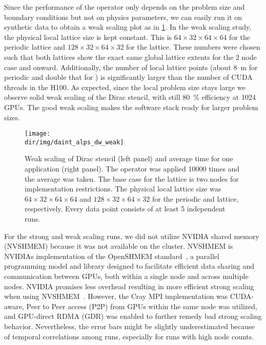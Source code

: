 Since the performance of the operator only depends on the problem size and boundary conditions but not on physics parameters, we can easily run it on synthetic data to obtain a weak scaling plot as in \cref{fig:daint:alps:dw:weak}.
In the weak scaling study, the physical local lattice size is kept constant.
This is $64 \times 32 \times 64 \times 64$ for the periodic lattice and $128 \times 32 \times 64 \times 32$ for the \Cstar lattice.
These numbers were chosen such that both lattices show the exact same global lattice extents for the \num{2} node case and onward.
Additionally, the number of local lattice points (about \SI{8}{m} for periodic and double that for \Cstar) is significantly larger than the number of CUDA threads in the H100.
As expected, since the local problem size stays large we observe solid weak scaling of the Dirac stencil, with still \SI{80}{\percent} efficiency at \num{1024} GPUs.
The good weak scaling makes the software stack ready for larger problem sizes.
\begin{figure}
    \centering
    \texttt{[image: \\dir/img/daint\_alps\_dw\_weak]}
    \caption{Weak scaling of Dirac stencil (left panel) and average time for one application (right panel). The operator was applied \num{10000} times and the average was taken. The base case for the \Cstar lattice is two nodes for implementation restrictions. The physical local lattice size was $64 \times 32 \times 64 \times 64$ and $128 \times 32 \times 64 \times 32$ for the periodic and \Cstar lattice, respectively. Every data point consists of at least \num{5} independent runs. }
    \label{fig:daint:alps:dw:weak}
\end{figure}

For the strong and weak scaling runs, we did not utilize NVIDIA shared memory (NVSHMEM) because it was not available on the cluster.
NVSHMEM is NVIDIAs implementation of the OpenSHMEM standard~\cite{online:openshmem}, a parallel programming model and library designed to facilitate efficient data sharing and communication between GPUs, both within a single node and across multiple nodes.
NVIDIA promises less overhead resulting in more efficient strong scaling when using NVSHMEM~\cite{online:nvshmem}.
However, the Cray MPI implementation was CUDA-aware, Peer to Peer access (P2P) from GPUs within the same node was utilized, and GPU-direct RDMA (GDR) was enabled to further remedy bad strong scaling behavior.
Nevertheless, the error bars might be slightly underestimated because of temporal correlations among runs, especially for runs with high node counts.

